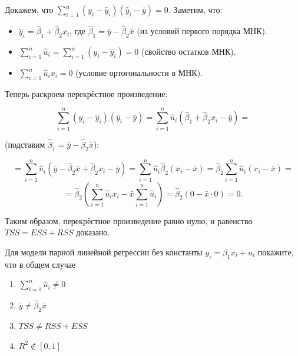 \documentclass[12pt]{article}
\newcommand{\hb}{\hat{\beta}}
\newcommand{\hu}{\hat{u}}
\newcommand{\RSS}{RSS}
\newcommand{\ESS}{ESS}
\newcommand{\TSS}{TSS}
\begin{document}
\begin{sol}
\begin{enumerate}
Докажем, что $\sum_{i=1}^n (y_i - \hat{y}_i)(\hat{y}_i - \bar{y}) = 0$.
Заметим, что:
\begin{itemize}
    \item \(\hat{y}_i = \hat{\beta}_1 + \hat{\beta}_2 x_i\), где \(\hat{\beta}_1 = \bar{y} - \hat{\beta}_2 \bar{x}\) (из условий первого порядка МНК).
    \item \(\sum_{i=1}^n \hat{u}_i = \sum_{i=1}^n (y_i - \hat{y}_i) = 0\) (свойство остатков МНК).
    \item \(\sum_{i=1}^n \hat{u}_i x_i = 0\) (условие ортогональности в МНК).
\end{itemize}

Теперь раскроем перекрёстное произведение:

\[
\sum_{i=1}^n (y_i - \hat{y}_i)(\hat{y}_i - \bar{y}) = \sum_{i=1}^n \hat{u}_i (\hat{\beta}_1 + \hat{\beta}_2 x_i - \bar{y}) =
\]

(подставим $\hat{\beta}_1 = \bar{y} - \hat{\beta}_2 \bar{x}$):

\[
= \sum_{i=1}^n \hat{u}_i (\bar{y} - \hat{\beta}_2 \bar{x} + \hat{\beta}_2 x_i - \bar{y}) = \sum_{i=1}^n \hat{u}_i \hat{\beta}_2 (x_i - \bar{x}) = \hat{\beta}_2 \sum_{i=1}^n \hat{u}_i (x_i - \bar{x}) =
\]
\[
= \hat{\beta}_2 \left( \sum_{i=1}^n \hat{u}_i x_i - \bar{x} \sum_{i=1}^n \hat{u}_i \right) = \hat{\beta}_2 (0 - \bar{x} \cdot 0) = 0.
\]

Таким образом, перекрёстное произведение равно нулю, и равенство $\TSS = \ESS + \RSS$ доказано.
\end{enumerate}
\end{sol}

\begin{problem}
    Для модели парной линейной регрессии без константы $y_i = \beta_1 x_i + u_i$ покажите, что в общем случае

    \begin{enumerate}
        \item $\sum^n_{i=1} \hu_i \neq 0$
        \item $\bar{y} \neq \hb_2 \bar{x}$
        \item $\TSS \neq \RSS + \ESS$
        \item $R^2 \notin [0, 1]$
    \end{enumerate}
\end{problem}
\end{document}
